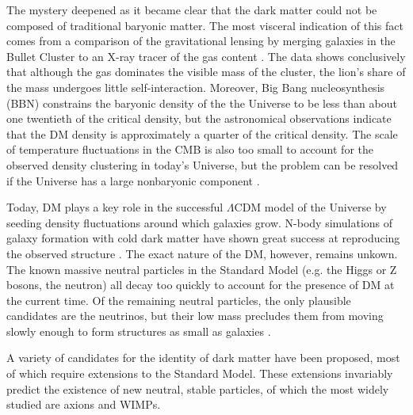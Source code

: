 The mystery deepened as it became clear that the dark matter could not be composed of traditional baryonic matter. The most visceral indication of this fact comes from a comparison of the gravitational lensing by merging galaxies in the Bullet Cluster to an X-ray tracer of the gas content \cite{clowe_direct_2006}. The data shows conclusively that although the gas dominates the visible mass of the cluster, the lion's share of the mass undergoes little self-interaction. Moreover, Big Bang nucleosynthesis (BBN) constrains the baryonic density of the the Universe to be less than about one twentieth of the critical density, but the astronomical observations indicate that the DM density is approximately a quarter of the critical density. The scale of temperature fluctuations in the CMB is also too small to account for the observed density clustering in today's Universe, but the problem can be resolved if the Universe has a large nonbaryonic component \cite{einasto_dark_2009}.

Today, DM plays a key role in the successful $\Lambda$CDM model of the Universe by seeding density fluctuations around which galaxies grow.
N-body simulations of galaxy formation with cold dark matter have shown great success at reproducing the observed structure \cite{bertone_particle_2010}.
The exact nature of the DM, however, remains unkown.
The known massive neutral particles in the Standard Model (e.g. the Higgs or Z bosons, the neutron) all decay too quickly to account for the presence of DM at the current time. Of the remaining neutral particles, the only plausible candidates are the neutrinos, but their low mass precludes them from moving slowly enough to form structures as small as galaxies \cite{einasto_dark_2009}. 

A variety of candidates for the identity of dark matter have been proposed, most of which require extensions to the Standard Model. 
These extensions invariably predict the existence of new neutral, stable particles, of which the most widely studied are axions and WIMPs.

